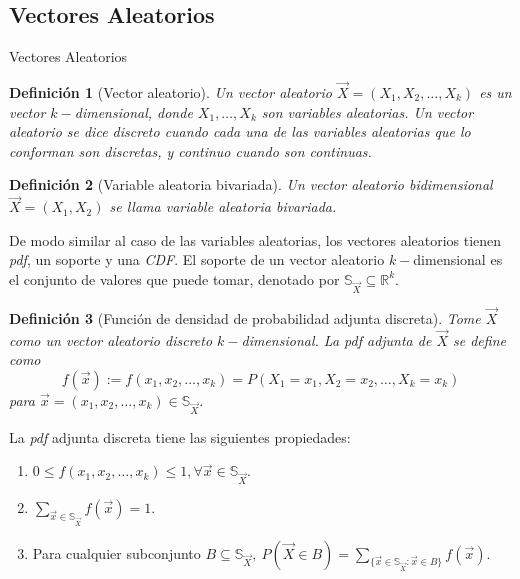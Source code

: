 \documentclass{beamer}
\newtheorem{defi}{Definición}[section]
\begin{document}
	\subsection{Vectores Aleatorios}	
	\begin{frame}[allowframebreaks]{Vectores Aleatorios}
	\begin{defi}[Vector aleatorio]
		Un vector aleatorio $\vec{X}=(X_1,X_2,\dots,X_k)$ es un vector $k-$dimensional, donde $X_1,\dots,X_k$ son variables aleatorias. Un vector aleatorio se dice discreto cuando cada una de las variables aleatorias que lo conforman son discretas, y continuo cuando son continuas.
	\end{defi}
	
	\begin{defi}[Variable aleatoria bivariada]
		Un vector aleatorio bidimensional $\vec{X}=(X_1,X_2)$ se llama variable aleatoria bivariada.
	\end{defi}
	\vspace{2cm}
	De modo similar al caso de las variables aleatorias, los vectores aleatorios tienen \textit{pdf}, un soporte y una \textit{CDF}. El soporte de un vector aleatorio $k-$dimensional es el conjunto de valores que puede tomar, denotado por $\mathbb{S}_{\vec{X}}\subseteq\mathbb{R}^k.$
	
	\begin{defi}[Función de densidad de probabilidad adjunta discreta]
		Tome $\vec{X}$ como un vector aleatorio discreto $k-$dimensional. La \textit{pdf} adjunta de $\vec{X}$ se define como
		$$f(\vec{x}):=f(x_1,x_2,\dots,x_k)=P(X_1=x_1,X_2=x_2,\dots, X_k=x_k)$$
		para $\vec{x}=(x_1,x_2,\dots,x_k)\in\mathbb{S}_{\vec{X}}.$
	\end{defi}
	\vspace{2cm}
	La \textit{pdf} adjunta discreta tiene las siguientes propiedades:
	\begin{enumerate}
		\item $0\leq f(x_1,x_2,\dots,x_k)\leq1, \forall \vec{x}\in\mathbb{S}_{\vec{X}}.$
		\item $\sum_{\vec{x}\in\mathbb{S}_{\vec{X}}}f(\vec{x})=1.$
		\item Para cualquier subconjunto $B\subseteq \mathbb{S}_{\vec{X}},\ P(\vec{X}\in B)=\sum_{\{\vec{x}\in\mathbb{S}_{\vec{X}}:\vec{x}\in B\}}f(\vec{x}).$
	\end{enumerate}
	

\end{frame}
\end{document}
